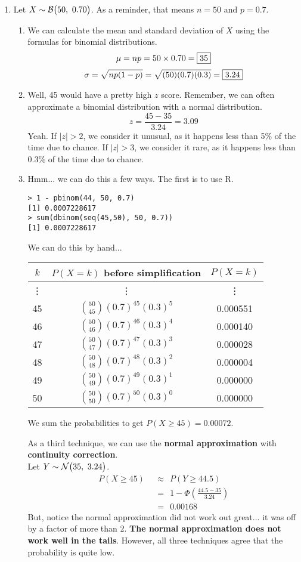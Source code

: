 \documentclass[12pt,letterpaper]{article}
\begin{document}
\begin{enumerate}
\item Let $X\sim \mathcal{B}\big(50,~0.70\big)$. As a reminder, that means $n=50$ and $p=0.7$.
\begin{enumerate}
\item We can calculate the mean and standard deviation of $X$ using the formulas for binomial distributions.
$$\mu = np = 50\times 0.70 = \fbox{35} $$
$$\sigma = \sqrt{np(1-p)} = \sqrt{(50)(0.7)(0.3)} = \fbox{3.24} $$
\item Well, 45 would have a pretty high $z$ score. Remember, we can often approximate a binomial distribution with a normal distribution.
 $$z = \frac{45-35}{3.24} = 3.09 $$
Yeah. If $|z|>2$, we consider it unusual, as it happens less than 5\% of the time due to chance. If $|z|>3$, we consider it rare, as it happens less than 0.3\% of the time due to chance.
\item Hmm... we can do this a few ways. The first is to use R.
\begin{verbatim}
> 1 - pbinom(44, 50, 0.7)
[1] 0.0007228617
> sum(dbinom(seq(45,50), 50, 0.7))
[1] 0.0007228617
\end{verbatim}
We can do this by hand...
\begin{center}
\renewcommand{\arraystretch}{1.5}
\begin{tabular}{|c|c|c|}\hline
$k$ & $P(X=k)$ before simplification & $P(X=k)$ \\ \hline
\vdots & \vdots & \vdots \\
45  & ${50\choose 45} (0.7)^{45} (0.3)^5$ &  0.000551 \\
46  & ${50\choose 46} (0.7)^{46} (0.3)^4 $ & 0.000140 \\
47  & ${50\choose 47} (0.7)^{47} (0.3)^3$ &  0.000028 \\
48  & ${50\choose 48} (0.7)^{48} (0.3)^2$ &  0.000004 \\
49  & ${50\choose 49} (0.7)^{49} (0.3)^1$ &  0.000000 \\
50  & ${50\choose 50} (0.7)^{50} (0.3)^0$ &  0.000000 \\ \hline
\end{tabular}
\end{center}
We sum the probabilities to get $P(X\ge 45) = 0.00072$.

As a third technique, we can use the {\bf normal approximation} with {\bf continuity correction}. \\
Let $Y\sim \mathcal{N}\big(35,~3.24\big)$.
\begin{align*}
P(X \ge 45) ~~&\approx~~ P(Y \ge 44.5)\\
 &=~~ 1-\Phi\left(\frac{44.5-35}{3.24} \right)\\
 &=~~0.00168
\end{align*}
But, notice the normal approximation did not work out great... it was off by a factor of more than 2. {\bf The normal approximation does not work well in the tails}. However, all three techniques agree that the probability is quite low.
\end{enumerate}


\end{enumerate}
\end{document}
